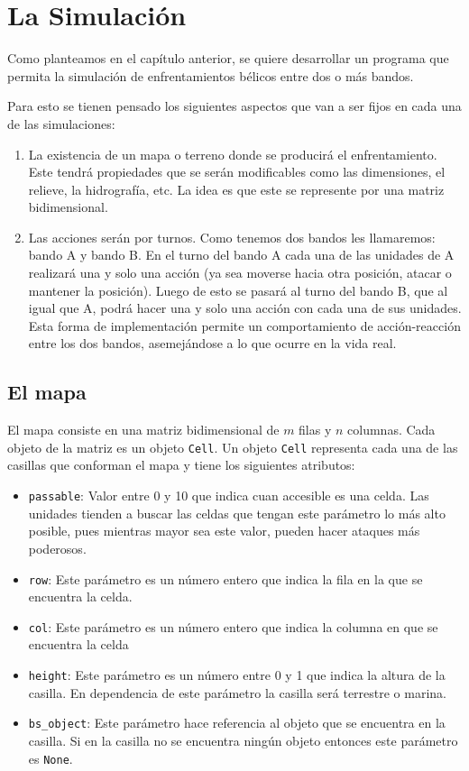 \section{La Simulaci\'on}

Como planteamos en el cap\'itulo anterior, se quiere desarrollar un programa que permita la simulaci\'on de enfrentamientos b\'elicos entre dos o m\'as bandos.

Para esto se tienen pensado los siguientes aspectos que van a ser fijos en cada una de las simulaciones:

\begin{enumerate}
	\item La existencia de un mapa o terreno donde se producir\'a el enfrentamiento. Este tendr\'a propiedades que se ser\'an modificables como las dimensiones, el relieve, la hidrograf\'ia, etc. La idea es que este se represente por una matriz bidimensional.
	
	\item Las acciones ser\'an por turnos. Como tenemos dos bandos les llamaremos: bando A y bando B. En el turno del bando A cada una de las unidades de A realizar\'a una y solo una acci\'on (ya sea moverse hacia otra posici\'on, atacar o mantener la posici\'on). Luego de esto se pasar\'a al turno del bando B, que al igual que A, podr\'a hacer una y solo una acci\'on con cada una de sus unidades. Esta forma de implementaci\'on permite un comportamiento de acci\'on-reacci\'on entre los dos bandos, asemej\'andose a lo que ocurre en la vida real.
	
\end{enumerate}

\subsection{El mapa}

El mapa consiste en una matriz bidimensional de $m$ filas y $n$ columnas. Cada objeto de la matriz es un objeto \verb|Cell|. Un objeto \verb|Cell| representa cada una de las casillas que conforman el mapa y tiene los siguientes atributos:

\begin{itemize}
	\item \verb|passable|: Valor entre 0 y 10 que indica cuan accesible es una celda. Las unidades tienden a buscar las celdas que tengan este par\'ametro lo m\'as alto posible, pues mientras mayor sea este valor, pueden hacer ataques m\'as poderosos.
	\item \verb|row|: Este par\'ametro es un n\'umero entero que indica la fila en la que se encuentra la celda.
	\item \verb|col|: Este par\'ametro es un n\'umero entero que indica la columna en que se encuentra la celda
	\item \verb|height|: Este par\'ametro es un n\'umero entre 0 y 1 que indica la altura de la casilla. En dependencia de este par\'ametro la casilla ser\'a terrestre o marina.
	\item \verb|bs_object|: Este par\'ametro hace referencia al objeto que se encuentra en la casilla. Si en la casilla no se encuentra ning\'un objeto entonces este par\'ametro es \verb|None|.
\end{itemize}

